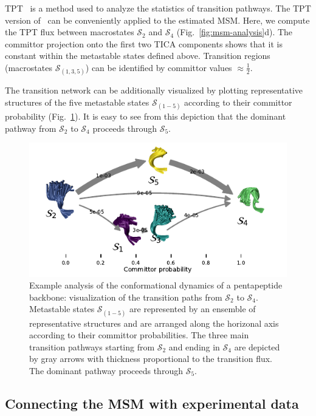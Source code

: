 \documentclass[9pt,tutorial]{livecoms}
\begin{document}
TPT~\cite{weinan-tpt,metzner-msm-tpt} is a method used to analyze the statistics of transition pathways. The TPT version of~\cite{noe-folding-pathways} can be conveniently applied to the estimated MSM. Here, we compute the TPT flux between macrostates $\mathcal{S}_2$ and $\mathcal{S}_4$ (Fig.~\ref{fig:msm-analysis}d).
The committor projection onto the first two TICA components shows that it is constant within the metastable states defined above.
Transition regions (macrostates $\mathcal{S}_{(1,3,5)}$) can be identified by committor values $\approx \frac{1}{2}$.

The transition network can be additionally visualized by plotting representative structures of the five metastable states $\mathcal{S}_{(1-5)}$ according to their committor probability (Fig.~\ref{fig:tpt-network}). It is easy to see from this depiction that the dominant pathway from $\mathcal{S}_2$ to $\mathcal{S}_4$ proceeds through $\mathcal{S}_5$.

\begin{figure}
\includegraphics{figure_4}
\caption{Example analysis of the conformational dynamics of a pentapeptide backbone:
visualization of the transition paths from $\mathcal{S}_2$ to $\mathcal{S}_4$.
Metastable states $\mathcal{S}_{(1-5)}$ are represented by an ensemble of representative structures and are arranged along the horizonal axis according to their committor probabilities. The three main transition pathways starting from $\mathcal{S}_2$ and ending in $\mathcal{S}_4$ are depicted by gray arrows with thickness proportional to the transition flux. The dominant pathway proceeds through $\mathcal{S}_5$.}
\label{fig:tpt-network}
\end{figure}

\subsection{Connecting the MSM with experimental data}
\end{document}
